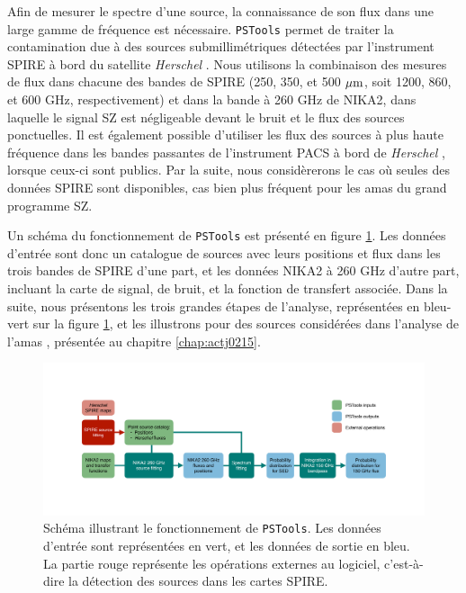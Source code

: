 Afin de mesurer le spectre d'une source, la connaissance de son flux dans une large gamme de fréquence est nécessaire.
\texttt{PSTools} permet de traiter la contamination due à des sources submillimétriques détectées par l'instrument SPIRE à bord du satellite \textit{Herschel} \cite{griffin_herschel-spire_2010}.
Nous utilisons la combinaison des mesures de flux dans chacune des bandes de SPIRE (250, 350, et 500 ${\rm \mu m}$, soit 1200, 860, et 600 GHz, respectivement) et dans la bande à 260 GHz de NIKA2, dans laquelle le signal SZ est négligeable devant le bruit et le flux des sources ponctuelles.
Il est également possible d'utiliser les flux des sources à plus haute fréquence dans les bandes passantes de l'instrument PACS à bord de \textit{Herschel} \cite{poglitsch_photodetector_2010}, lorsque ceux-ci sont publics.
Par la suite, nous considèrerons le cas où seules des données SPIRE sont disponibles, cas bien plus fréquent pour les amas du grand programme SZ.

Un schéma du fonctionnement de \texttt{PSTools} est présenté en figure \ref{fig:pstools_schema}.
Les données d'entrée sont donc un catalogue de sources avec leurs positions et flux dans les trois bandes de SPIRE d'une part, et les données NIKA2 à 260 GHz d'autre part, incluant la carte de signal, de bruit, et la fonction de transfert associée.
Dans la suite, nous présentons les trois grandes étapes de l'analyse, représentées en bleu-vert sur la figure \ref{fig:pstools_schema}, et les illustrons pour des sources considérées dans l'analyse de l'amas \act, présentée au chapitre \ref{chap:actj0215}.

\begin{figure}[t]
    \centering
    \includegraphics[width=\linewidth, trim={8cm, 7cm, 8cm, 7cm}, clip]{Figures/Chap_decor/PSTools.pdf}
    \caption{
        Schéma illustrant le fonctionnement de \texttt{PSTools}.
        Les données d'entrée sont représentées en vert, et les données de sortie en bleu.
        La partie rouge représente les opérations externes au logiciel, c'est-à-dire la détection des sources dans les cartes SPIRE.
    }
    \label{fig:pstools_schema}
\end{figure}

